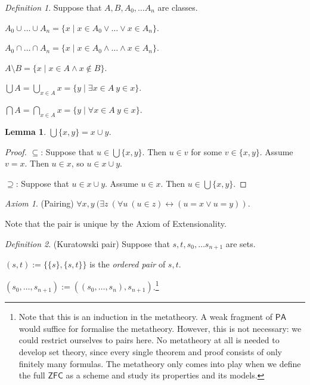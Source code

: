\documentclass[a4paper, 11pt]{amsart}
\newtheorem{lemma}[lemma]{Lemma}
\theoremstyle{remark}
\newtheorem{definition}[definition]{Definition}
\newtheorem*{axiom}{Axiom}
\newcommand{\axiomft}[1]{\mathsf{#1}}
\newcommand{\PA}{\axiomft{PA}}
\newcommand{\ZFC}{\axiomft{ZFC}}
\newenvironment{enumerate-(1)}{\begin{enumerate}[label={\upshape (\arabic*)}, leftmargin=2pc]}{\end{enumerate}}
\begin{document}
\begin{definition} 
Suppose that $A,B, A_0,\dots A_n$ are classes. 
\begin{enumerate-(1)} 
\item 
$A_0\cup \dots \cup A_n=\{x \mid x\in A_0 \vee \dots \vee x\in A_n\}$. 
\item 
$A_0\cap \dots \cap A_n=\{x \mid x\in A_0 \wedge \dots \wedge x\in A_n\}$. 
\item 
$A\setminus B=\{x \mid x\in A \wedge x\notin B\}$. 
\item 
$\bigcup A = \bigcup_{x\in A} x = \{y\mid \exists x\in A\ y\in x \}$. 
\item 
$\bigcap A = \bigcap_{x\in A} x = \{y\mid \forall x\in A\ y\in x \}$. 
\end{enumerate-(1)} 
\end{definition} 

\begin{lemma} 
$\bigcup \{x,y \}= x\cup y$. 
\end{lemma} 
\begin{proof}
$\subseteq $: Suppose that $u\in \bigcup \{x,y \}$. 
Then $u\in v$ for some $v\in \{x,y \}$. 
Assume $v=x$. 
Then $u\in x$, so $u\in x\cup y$. 

$\supseteq $: Suppose that $u\in x\cup y$. 
Assume $u\in x$. 
Then $u\in \bigcup \{x,y \}$. 
\end{proof} 

\begin{axiom}(Pairing) 
$\forall x,y\ (\exists z\ (\forall u\ (u\in z) \leftrightarrow (u=x\vee u=y))$. 
\end{axiom} 

Note that the pair is unique by the Axiom of Extensionality. 

\begin{definition}(Kuratowski pair) 
\label{definition ordered pair} 
Suppose that $s,t, s_0,\dots s_{n+1}$ are sets. 
\begin{enumerate-(1)} 
\item 
$(s,t):=\{ \{s\}, \{s,t\} \}$ is the \emph{ordered pair} of $s,t$. 
\item 
$(s_0,\dots,s_{n+1}):=((s_0,\dots,s_n),s_{n+1})$.\footnote{Note that this is an induction in the metatheory. A weak fragment of $\PA$ would suffice for formalise the metatheory. However, this is not necessary: we could restrict ourselves to pairs here. No metatheory at all is needed to develop set theory, since every single theorem and proof consists of only finitely many formulas. The metatheory only comes into play when we define the full $\ZFC$ as a scheme and study its properties and its models. }   
\end{enumerate-(1)} 
\end{definition} 
\end{document}
